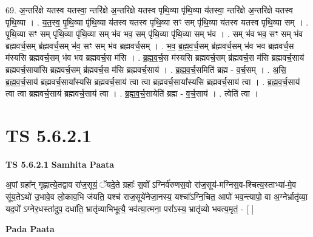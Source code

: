 \documentclass[17pt]{extarticle}
\begin{document}
69. अ॒न्तरि॑क्षे यतस्व यतस्वा॒ न्तरि॑क्षे अ॒न्तरि॑क्षे यतस्व पृथि॒व्या पृ॑थि॒व्या य॑तस्वा॒ न्तरि॑क्षे 
अ॒न्तरि॑क्षे यतस्व पृथि॒व्या । . य॒त॒स्व॒ पृ॒थि॒व्या पृ॑थि॒व्या य॑तस्व यतस्व पृथि॒व्या सꣳ सम् पृ॑थि॒व्या य॑तस्व यतस्व पृथि॒व्या सम् । . पृ॒थि॒व्या सꣳ सम् पृ॑थि॒व्या पृ॑थि॒व्या सम् भ॑व भव॒ सम् पृ॑थि॒व्या पृ॑थि॒व्या सम् भ॑व । . सम् भ॑व भव॒ सꣳ सम् भ॑व ब्रह्मवर्च॒सम् ब्र॑ह्मवर्च॒सम् भ॑व॒ सꣳ सम् भ॑व ब्रह्मवर्च॒सम् । . भ॒व॒ ब्र॒ह्म॒व॒र्च॒सम् ब्र॑ह्मवर्च॒सम् भ॑व भव ब्रह्मवर्च॒स म॑स्यसि ब्रह्मवर्च॒सम् भ॑व भव ब्रह्मवर्च॒स म॑सि । . ब्र॒ह्म॒व॒र्च॒स म॑स्यसि ब्रह्मवर्च॒सम् ब्र॑ह्मवर्च॒स म॑सि ब्रह्मवर्च॒साय॑ ब्रह्मवर्च॒साया॑सि ब्रह्मवर्च॒सम् ब्र॑ह्मवर्च॒स म॑सि ब्रह्मवर्च॒साय॑ । . ब्र॒ह्म॒व॒र्च॒समिति॑ ब्रह्म - व॒र्च॒सम् । . अ॒सि॒ ब्र॒ह्म॒व॒र्च॒साय॑ ब्रह्मवर्च॒साया᳚स्यसि ब्रह्मवर्च॒साय॑ त्वा त्वा ब्रह्मवर्च॒साया᳚स्यसि ब्रह्मवर्च॒साय॑ त्वा । . ब्र॒ह्म॒व॒र्च॒साय॑ त्वा त्वा ब्रह्मवर्च॒साय॑ ब्रह्मवर्च॒साय॑ त्वा । . ब्र॒ह्म॒व॒र्च॒सायेति॑ ब्रह्म - व॒र्च॒साय॑ । . त्वेति॑ त्वा । \newline
\pagebreak
{}

\section{ TS 5.6.2.1 }

\textbf{TS 5.6.2.1 } \newline
\textbf{Samhita Paata} \newline

अ॒पां ग्रहा᳚न् गृह्णात्ये॒तद्वाव रा॑ज॒सूयं॒ ॅयदे॒ते ग्रहाः᳚ स॒वो᳚ ऽग्निर्व॑रुणस॒वो रा॑ज॒सूय॑-मग्निस॒व-श्चित्य॒स्ताभ्या॑-मे॒व सू॑य॒तेऽथो॑ उ॒भावे॒व लो॒काव॒भि ज॑यति॒ यश्च॑ राज॒सूये॑नेजा॒नस्य॒ यश्चा᳚ऽग्नि॒चित॒ आपो॑ भव॒न्त्यापो॒ वा अ॒ग्नेर्भ्रातृ॑व्या॒ यद॒पो᳚ ऽग्नेर॒धस्ता॑दुप॒ दधा॑ति॒ भ्रातृ॑व्याभिभूत्यै॒ भव॑त्या॒त्मना॒ परा᳚ऽस्य॒ भ्रातृ॑व्यो भवत्य॒मृतं॒ - [  ] \newline

\textbf{Pada Paata} \newline
\end{document}
